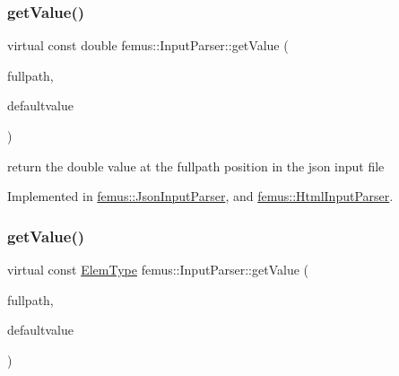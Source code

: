 \mbox{\label{classfemus_1_1_input_parser_ab7ff8e8528d6f9e7cc6f928f7020687e}} 
\subsubsection{\texorpdfstring{get\+Value()}{getValue()}\hspace{0.1cm}{\footnotesize\ttfamily [2/6]}}
{\footnotesize\ttfamily virtual const double femus\+::\+Input\+Parser\+::get\+Value (\begin{DoxyParamCaption}\item[{const std\+::string \&}]{fullpath,  }\item[{const double}]{defaultvalue }\end{DoxyParamCaption})\hspace{0.3cm}{\ttfamily [pure virtual]}}

return the double value at the {\ttfamily fullpath} position in the json input file 

Implemented in \mbox{\hyperlink{classfemus_1_1_json_input_parser_a38b41ae56ab7b1b3780c4692d06cbd33}{femus\+::\+Json\+Input\+Parser}}, and \mbox{\hyperlink{classfemus_1_1_html_input_parser_aec006b4a50b3e9d7805483672015b140}{femus\+::\+Html\+Input\+Parser}}.

\mbox{\label{classfemus_1_1_input_parser_a8feee424de84c28d6689361e22769ed1}} 
\subsubsection{\texorpdfstring{get\+Value()}{getValue()}\hspace{0.1cm}{\footnotesize\ttfamily [3/6]}}
{\footnotesize\ttfamily virtual const \mbox{\hyperlink{_elem_type_enum_8hpp_a1b014294b9757a001707c979e2bab627}{Elem\+Type}} femus\+::\+Input\+Parser\+::get\+Value (\begin{DoxyParamCaption}\item[{const std\+::string \&}]{fullpath,  }\item[{const \mbox{\hyperlink{_elem_type_enum_8hpp_a1b014294b9757a001707c979e2bab627}{Elem\+Type}}}]{defaultvalue }\end{DoxyParamCaption})\hspace{0.3cm}{\ttfamily [pure virtual]}}

